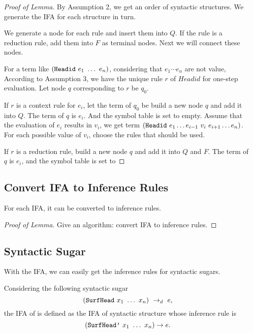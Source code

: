 \begin{proof}[Proof of Lemma]

By Assumption 2, we get an order of syntactic structures. We generate the IFA for each structure in turn.

We generate a node for each rule and insert them into $Q$. If the rule is a reduction rule, add them into $F$ as terminal nodes. Next we will connect these nodes.

For a term like $(\mbox{\tt Headid}~e_1~\ldots~e_n)$, considering that $e_1\cdots e_n$ are not value, According to Assumption 3, we have the unique rule $r$ of $Headid$ for one-step evaluation. Let node $q$ corresponding to $r$ be $q_0$.

If $r$ is a context rule for $e_i$, let the term of $q_0$ be build a new node $q$ and add it into $Q$. The term of $q$ is $e_i$. And the symbol table is set to empty. Assume that the evaluation of $e_i$ results in $v_i$, we get term $(\mbox{\tt Headid}~e_1 \ldots e_{i-1}~v_i~e_{i+1} \ldots e_n)$. For each possible value of $v_i$, choose the rules that should be used.

If $r$ is a reduction rule, build a new node $q$ and add it into $Q$ and $F$. The term of $q$ is $e_i$, and the symbol table is set to



\end{proof}

\subsection{Convert IFA to Inference Rules}

\begin{lemma}
For each IFA, it can be converted to inference rules.
\end{lemma}

\begin{proof}[Proof of Lemma]
Give an algorithm: convert IFA to inference rules.
\end{proof}

\subsection{Syntactic Sugar}

With the IFA, we can easily get the inference rules for syntactic sugars.

\begin{Def}

Considering the following syntactic sugar
\[
(\mbox{\tt SurfHead}~x_1~\ldots~x_n) ~\rightarrow_d~ e,
\]
the IFA of  is defined as the IFA of syntactic structure  whose inference rule is
\[
(\mbox{\tt SurfHead'}~x_1~\ldots~x_n)\rightarrow e.
\]



\end{Def}
